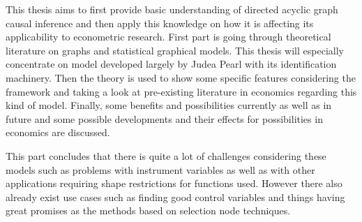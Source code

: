 \documentclass[main=english,12pt,a4paper,pdftex,econ,utf8]{aaltothesis}
\begin{document}
\makecoverpage



\begin{abstractpage}[english]
This thesis aims to first provide basic understanding of directed acyclic graph causal inference and then apply this knowledge on how it is affecting its applicability to econometric research. First part is going through theoretical literature on graphs and statistical graphical models. This thesis will especially concentrate on model developed largely by Judea Pearl with its identification machinery. Then the theory is used to show some specific features considering the framework and taking a look at pre-existing literature in economics regarding this kind of model. Finally, some benefits and possibilities currently as well as in future and some possible developments and their effects for possibilities in economics are discussed. 

This part concludes that there is quite a lot of challenges considering these models such as problems with instrument variables as well as with other applications requiring shape restrictions for functions used. However there also already exist use cases such as finding good control variables and things having great promises as the methods based on selection node techniques.
\begin{comment}
Your abstract in English. Try to keep the abstract short; approximately 
100 words should be enough. The abstract explains your research topic, 
the methods you have used, and the results you obtained.  
Your abstract in English. Try to keep the abstract short; approximately 
100 words should be enough. The abstract explains your research topic, 
the methods you have used, and the results you obtained.  

Your abstract in English. Try to keep the abstract short; approximately 
100 words should be enough. The abstract explains your research topic, 
the methods you have used, and the results you obtained.  
Your abstract in English. Try to keep the abstract short; approximately 
100 words should be enough. The abstract explains your research topic, 
the methods you have used, and the results you obtained.  
\end{comment}    
\end{abstractpage}
\end{document}
